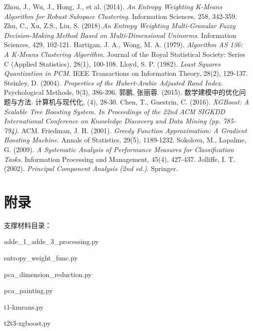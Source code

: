 \documentclass{article}
\begin{document}
\begin{thebibliography}{9}
 Zhou, J., Wu, J., Hong, J., et al. (2014). \textit{ An Entropy Weighting K-Means Algorithm for Robust Subspace Clustering}. Information Sciences, 258, 342-359.
 Zhu, C., Xu, Z.S., Liu, S. (2018).\textit{An Entropy Weighting Multi-Granular Fuzzy Decision-Making Method Based on Multi-Dimensional Uninorms}. Information Sciences, 429, 102-121.
 Hartigan, J. A., Wong, M. A. (1979). \textit{Algorithm AS 136: A K-Means Clustering Algorithm}. Journal of the Royal Statistical Society: Series C (Applied Statistics), 28(1), 100-108.
 Lloyd, S. P. (1982). \textit{Least Squares Quantization in PCM}. IEEE Transactions on Information Theory, 28(2), 129-137.
 Steinley, D. (2004). \textit{Properties of the Hubert-Arabie Adjusted Rand Index}. Psychological Methods, 9(3), 386-396.
 郭鹏, 张丽蓉. (2015). 数学建模中的优化问题与方法. 计算机与现代化, (4), 28-30.
 Chen, T., Guestrin, C. (2016). \textit{XGBoost: A Scalable Tree Boosting System. In Proceedings of the 22nd ACM SIGKDD International Conference on Knowledge Discovery and Data Mining (pp. 785-794)}. ACM.
 Friedman, J. H. (2001). \textit{Greedy Function Approximation: A Gradient Boosting Machine}. Annals of Statistics, 29(5), 1189-1232.
 Sokolova, M., Lapalme, G. (2009). \textit{A Systematic Analysis of Performance Measures for Classification Tasks}. Information Processing and Management, 45(4), 427-437.
 Jolliffe, I. T. (2002). \textit{Principal Component Analysis (2nd ed.)}. Springer.
\end{thebibliography}

\newpage

\lstset{basicstyle=\ttfamily}

\section{附录}

支撑材料目录：

adde\_1\_adde\_3\_processing.py

entropy\_weight\_func.py

pca\_dimension\_reduction.py

pca\_painting.py

t1-kmeans.py

t2t3-xgboost.py
\end{document}
